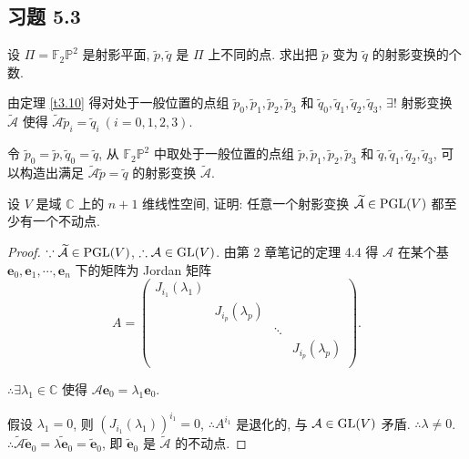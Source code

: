 \documentclass[color=black,device=normal,lang=cn,mode=geye]{elegantnote}
\begin{document}
\subsection{习题 5.3}
\begin{exercise}%
    设 $\varPi=\mathbb{F}_2\mathbb{P}^2$ 是射影平面, $\tilde{p},\tilde{q}$ 是 $\varPi$ 上不同的点. 求出把 $\tilde{p}$ 变为 $\tilde{q}$ 的射影变换的个数.
\end{exercise}
\begin{solution}
    由定理 \ref{t3.10} 得对处于一般位置的点组 $\tilde{p}_0,\tilde{p}_1,\tilde{p}_2,\tilde{p}_3$ 和 $\tilde{q}_0,\tilde{q}_1,\tilde{q}_2,\tilde{q}_3$, $\exists!$ 射影变换 $\widetilde{\mathcal{A}}$ 使得 $\widetilde{\mathcal{A}}\tilde{p}_i=\tilde{q}_i\ (i=0,1,2,3)$.

    令 $\tilde{p}_0=\tilde{p},\tilde{q}_0=\tilde{q}$, 从 $\mathbb{F}_2\mathbb{P}^2$ 中取处于一般位置的点组 $\tilde{p},\tilde{p}_1,\tilde{p}_2,\tilde{p}_3$ 和 $\tilde{q},\tilde{q}_1,\tilde{q}_2,\tilde{q}_3$, 可以构造出满足 $\widetilde{\mathcal{A}}\tilde{p}=\tilde{q}$ 的射影变换 $\widetilde{\mathcal{A}}$.
\end{solution}
\begin{exercise}%
    设 $V$ 是域 $\mathbb{C}$ 上的 $n+1$ 维线性空间, 证明: 任意一个射影变换 $\widetilde{\mathcal{A}}\in\operatorname{PGL} (V)$ 都至少有一个不动点.
\end{exercise}
\begin{proof}
    $\because\widetilde{\mathcal{A}}\in\operatorname{PGL} (V)$, $\therefore\mathcal{A}\in\operatorname{GL} (V)$. 由第 2 章笔记的定理 4.4 得 $\mathcal{A}$ 在某个基 $\boldsymbol{e}_0,\boldsymbol{e}_1,\cdots,\boldsymbol{e}_n$ 下的矩阵为 Jordan 矩阵
    \[A=\begin{pmatrix}
        J_{i_1}(\lambda_1) \\
        & J_{i_p}(\lambda_p) \\
        && \ddots \\
        &&& J_{i_p}(\lambda_p) \\
    \end{pmatrix}.\]
    
    $\therefore\exists\lambda_1\in\mathbb{C}$ 使得 $\mathcal{A}\boldsymbol{e}_0=\lambda_1\boldsymbol{e}_0$.

    假设 $\lambda_1=0$, 则 $(J_{i_1}(\lambda_1))^{i_1}=0$, $\therefore A^{i_1}$ 是退化的, 与 $\mathcal{A}\in\operatorname{GL} (V)$ 矛盾. $\therefore\lambda\neq0$. $\therefore\widetilde{\mathcal{A}}\tilde{\boldsymbol{e}}_0=\widetilde{\lambda\boldsymbol{e}_0}=\tilde{\boldsymbol{e}}_0$, 即 $\tilde{\boldsymbol{e}}_0$ 是 $\widetilde{\mathcal{A}}$ 的不动点.
\end{proof}
\end{document}
